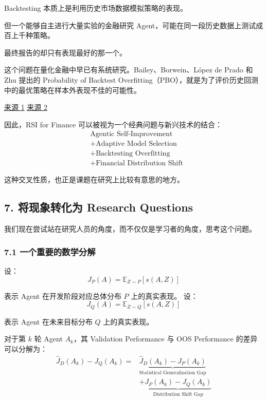 Backtesting 本质上是利用历史市场数据模拟策略的表现。

但一个能够自主进行大量实验的金融研究 Agent，可能在同一段历史数据上测试成百上千种策略。

最终报告的却只有表现最好的那一个。

这个问题在量化金融中早已有系统研究。Bailey、Borwein、López de Prado 和 Zhu 提出的 Probability of Backtest Overfitting（PBO），就是为了评价历史回测中的最优策略在样本外表现不佳的可能性。

\href{https://www.risk.net/journal-of-computational-finance/2471206/the-probability-of-backtest-overfitting}{来源 1} \href{https://scholarworks.wmich.edu/math_pubs/40/}{来源 2}

因此，RSI for Finance 可以被视为一个经典问题与新兴技术的结合：
\[\boxed{
\begin{aligned}
&\text{Agentic Self-Improvement}\\
&+\text{Adaptive Model Selection}\\
&+\text{Backtesting Overfitting}\\
&+\text{Financial Distribution Shift}
\end{aligned}
}\]

这种交叉性质，也正是课题在研究上比较有意思的地方。

\hypertarget{part-1-03-0001-ux5c06ux73b0ux8c61ux8f6cux5316ux4e3a-research-questions}{%
\subsection{7. 将现象转化为 Research Questions}\label{part-1-03-0001-ux5c06ux73b0ux8c61ux8f6cux5316ux4e3a-research-questions}}

我们现在尝试站在研究人员的角度，而不仅仅是学习者的角度，思考这个问题。

\hypertarget{part-1-03-0001-ux4e00ux4e2aux91cdux8981ux7684ux6570ux5b66ux5206ux89e3}{%
\subsubsection{7.1 一个重要的数学分解}\label{part-1-03-0001-ux4e00ux4e2aux91cdux8981ux7684ux6570ux5b66ux5206ux89e3}}

设：
\[J_P(A)=\mathbb E_{Z\sim P}[s(A,Z)]\]

表示 Agent 在开发阶段对应总体分布 \(P\) 上的真实表现。 设：
\[J_Q(A)=\mathbb E_{Z\sim Q}[s(A,Z)]\]

表示 Agent 在未来目标分布 \(Q\) 上的真实表现。

对于第 \(k\) 轮 Agent \(A_k\)，其 Validation Performance 与 OOS Performance 的差异可以分解为：
\[\boxed{
\begin{aligned}
\widehat J_D(A_k)-J_Q(A_k)
={}&
\underbrace{
\widehat J_D(A_k)-J_P(A_k)
}_{\text{Statistical Generalization Gap}}
\\
&+
\underbrace{
J_P(A_k)-J_Q(A_k)
}_{\text{Distribution Shift Gap}}
\end{aligned}
}\]

